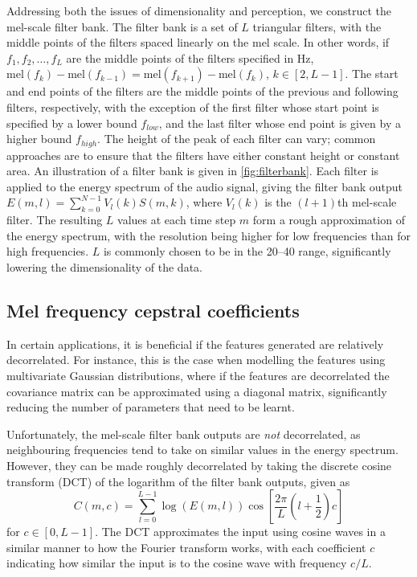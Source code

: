 Addressing both the issues of dimensionality and perception, we construct the mel-scale filter bank.
The filter bank is a set of $L$ triangular filters, with the middle points of the filters spaced linearly on the mel scale.
In other words, if $f_1, f_2, \dots, f_L$ are the middle points of the filters specified in \si{\Hz}, $\mathrm{mel}(f_k) - \mathrm{mel}(f_{k-1}) = \mathrm{mel}(f_{k+1}) - \mathrm{mel}(f_k)$, $k \in [2, L-1]$.
The start and end points of the filters are the middle points of the previous and following filters, respectively, with the exception of the first filter whose start point is specified by a lower bound $f_{low}$, and the last filter whose end point is given by a higher bound $f_{high}$.
The height of the peak of each filter can vary; common approaches are to ensure that the filters have either constant height or constant area.
An illustration of a filter bank is given in \cref{fig:filterbank}.
Each filter is applied to the energy spectrum of the audio signal, giving the filter bank output $E(m,l) = \sum_{k=0}^{N-1}V_l(k)S(m,k)$, where $V_l(k)$ is the $(l+1)$th mel-scale filter.
The resulting $L$ values at each time step $m$ form a rough approximation of the energy spectrum, with the resolution being higher for low frequencies than for high frequencies.
$L$ is commonly chosen to be in the \numrange{20}{40} range, significantly lowering the dimensionality of the data.

\subsection{Mel frequency cepstral coefficients}

In certain applications, it is beneficial if the features generated are relatively decorrelated.
For instance, this is the case when modelling the features using multivariate Gaussian distributions, where if the features are decorrelated the covariance matrix can be approximated using a diagonal matrix, significantly reducing the number of parameters that need to be learnt.

Unfortunately, the mel-scale filter bank outputs are \emph{not} decorrelated, as neighbouring frequencies tend to take on similar values in the energy spectrum.
However, they can be made roughly decorrelated by taking the discrete cosine transform (DCT) of the logarithm of the filter bank outputs, given as
\[
C(m,c) = \sum_{l=0}^{L-1} \log(E(m,l)) \cos\left[\frac{2\pi}{L}\left(l+\frac{1}{2}\right)c\right]
\]
for $c \in [0, L - 1]$.
The DCT approximates the input using cosine waves in a similar manner to how the Fourier transform works, with each coefficient $c$ indicating how similar the input is to the cosine wave with frequency $c/L$.

